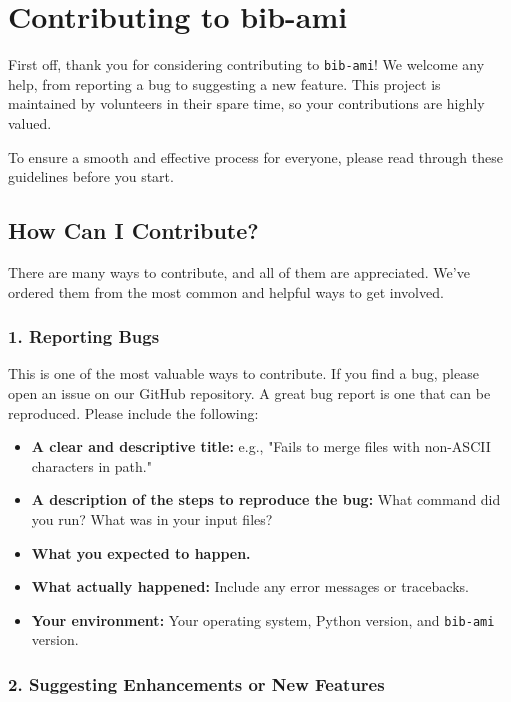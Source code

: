 \documentclass[11pt, a4paper]{article}
\begin{document}
\section*{Contributing to bib-ami}

First off, thank you for considering contributing to \texttt{bib-ami}! We welcome any help, from reporting a bug to suggesting a new feature. This project is maintained by volunteers in their spare time, so your contributions are highly valued.

To ensure a smooth and effective process for everyone, please read through these guidelines before you start.

\subsection*{How Can I Contribute?}

There are many ways to contribute, and all of them are appreciated.
We've ordered them from the most common and helpful ways to get involved.

\subsubsection*{1. Reporting Bugs}

This is one of the most valuable ways to contribute.
If you find a bug, please open an issue on our GitHub repository.
A great bug report is one that can be reproduced. Please include the following:

\begin{itemize}[leftmargin=*]
    \item \textbf{A clear and descriptive title:} e.g., "Fails to merge files with non-ASCII characters in path."
    \item \textbf{A description of the steps to reproduce the bug:} What command did you run? What was in your input files?
    \item \textbf{What you expected to happen.}
    \item \textbf{What actually happened:} Include any error messages or tracebacks.
    \item \textbf{Your environment:} Your operating system, Python version, and \texttt{bib-ami} version.
\end{itemize}

\subsubsection*{2. Suggesting Enhancements or New Features}
\end{document}
